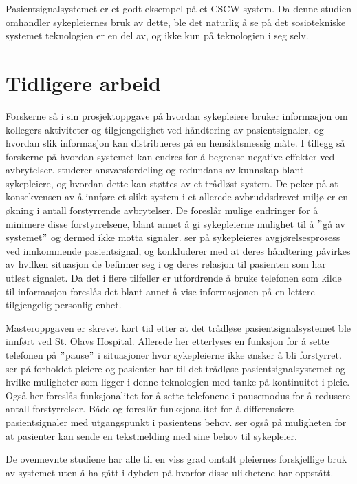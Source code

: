 \noindent
Pasientsignalsystemet er et godt eksempel på et CSCW-system. Da denne studien omhandler sykepleiernes bruk av dette, ble det naturlig å se på det sosiotekniske systemet teknologien er en del av, og ikke kun på teknologien i seg selv.

\section{Tidligere arbeid}
Forskerne så i sin prosjektoppgave \citep{Sund13} på hvordan sykepleiere bruker informasjon om kollegers aktiviteter og tilgjengelighet ved håndtering av pasientsignaler, og hvordan slik informasjon kan distribueres på en hensiktsmessig måte. I tillegg så forskerne på hvordan systemet kan endres for å begrense negative effekter ved avbrytelser. \citet{KlemetsRedundancy} studerer ansvarsfordeling og redundans av kunnskap blant sykepleiere, og hvordan dette kan støttes av et trådløst system. De peker på at konsekvensen av å innføre et slikt system i et allerede avbruddsdrevet miljø er en økning i antall forstyrrende avbrytelser. De foreslår mulige endringer for å minimere disse forstyrrelsene, blant annet å gi sykepleierne mulighet til å $"$gå av systemet$"$ og dermed ikke motta signaler. \citet{klemets13} ser på sykepleieres avgjørelsesprosess ved innkommende pasientsignal, og konkluderer med at deres håndtering påvirkes av hvilken situasjon de befinner seg i og deres relasjon til pasienten som har utløst signalet. Da det i flere tilfeller er utfordrende å bruke telefonen som kilde til informasjon foreslås det blant annet å vise informasjonen på en lettere tilgjengelig personlig enhet.

\noindent
Masteroppgaven \citep{Sletten09} er skrevet kort tid etter at det trådløse pasientsignalsystemet ble innført ved St. Olavs Hospital. Allerede her etterlyses en funksjon for å sette telefonen på $"$pause$"$ i situasjoner hvor sykepleierne ikke ønsker å bli forstyrret. \citet{Rygh13} ser på forholdet pleiere og pasienter har til det trådløse pasientsignalsystemet og hvilke muligheter som ligger i denne teknologien med tanke på kontinuitet i pleie. Også her foreslås funksjonalitet for å sette telefonene i pausemodus for å redusere antall forstyrrelser. Både \citet{Rygh13} og \citet{Selseth12} foreslår funksjonalitet for å differensiere pasientsignaler med utgangspunkt i pasientens behov. \citet{Selseth12} ser også på muligheten for at pasienter kan sende en tekstmelding med sine behov til sykepleier.

\noindent
De ovennevnte studiene har alle til en viss grad omtalt pleiernes forskjellige bruk av systemet uten å ha gått i dybden på hvorfor disse ulikhetene har oppstått.

